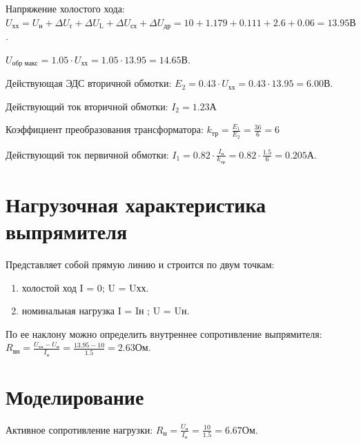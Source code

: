 \documentclass[a4paper, 14pt]{article}
\begin{document}
Напряжение холостого хода: $U_\text{хх} = U_\text{н} + \Delta U_\text{r} + \Delta U_\text{L} + \Delta U_\text{сх} + \Delta U_\text{др} = 10 + 1.179 + 0.111 + 2.6 + 0.06 = 13.95  \text{В} $.

$U_\text{обр макс} = 1.05 \cdot U_\text{хх} = 1.05 \cdot 13.95 = 14.65 \text{В}$.

Действующая ЭДС вторичной обмотки: $E_2 = 0.43 \cdot U_\text{хх} = 0.43 \cdot 13.95 = 6.00 \text{В}$.

Действующий ток вторичной обмотки: $I_2 = 1.23 \text{А}$

Коэффициент преобразования трансформатора: $k_\text{тр} = \frac{E_1}{E_2} = \frac{36}{6} = 6 $

Действующий ток первичной обмотки: $I_1 = 0.82 \cdot \frac{I_\text{н}}{k_\text{тр}} = 0.82 \cdot \frac{1.5}{6} = 0.205 \text{А}$.

\section{Нагрузочная характеристика выпрямителя}

Представляет собой прямую линию и строится по двум точкам:
\begin{enumerate}
  \item холостой ход I = 0; U = Uхх.
  \item номинальная нагрузка I = Iн ; U = Uн.
\end{enumerate}
\begin{center}


\end{center}
По ее наклону можно определить внутреннее сопротивление выпрямителя:$R_\text{вн} = \frac{U_\text{хх}-U_\text{н}}{I_\text{н}}  = \frac{13.95 - 10 }{1.5} = 2.63 \text{Ом}$.

\section{Моделирование}

Активное сопротивление нагрузки: $R_\text{н} = \frac{U_\text{н}}{I_\text{н}} = \frac{10}{1.5} = 6.67 \text{Ом}$.
\end{document}
